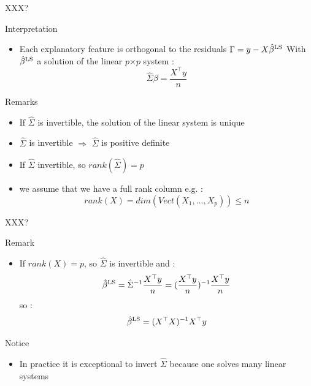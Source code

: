 \documentclass[unknownkeysallowed]{beamer}
\begin{document}
\begin{frame}{XXX?} %
\begin{alertblock}{Interpretation}
    \begin{itemize}
        \item  Each explanatory feature is orthogonal to the residuals $\Gamma=y-X\hat{\beta}^{\rm LS}$ With $\hat{\beta}^{\rm LS}$ a solution of the linear $p$$\times$$p$ system : $$ \hat{\Sigma}\beta= \frac{X^{\top} y}{n}  $$

    \end{itemize}
\end{alertblock}


\begin{block}{Remarks}
    \begin{itemize}
        \item  If $\hat{\Sigma}$ is invertible, the solution of the linear system is unique
        \item $\hat{\Sigma}$ is invertible $\Rightarrow$ $\hat{\Sigma}$ is positive definite
        \item If $\hat{\Sigma}$ invertible, so $rank(\hat{\Sigma})=p$
        \item we assume that we have a full rank column e.g. : $$rank(X)=dim(Vect(X_1,\dots,X_p)) \leq n $$

    \end{itemize}
\end{block}
\end{frame}


\begin{frame}{XXX?} %

\begin{alertblock}{Remark}
    \begin{itemize}
        \item  If $rank(X)=p$, so $\hat{\Sigma}$ is invertible and : $$\hat{\beta}^{\rm LS}=\hat{\Sigma}^{-1}\frac{X^{\top} y}{n}=(\frac{X^{\top} y}{n})^{-1} \frac{X^{\top} y}{n}$$
       so :  $$ \hat{\beta}^{\rm LS}=(X^{\top}X)^{-1}X^{\top}y$$

    \end{itemize}


\end{alertblock}

\begin{block}{Notice}
    \begin{itemize}
        \item  In practice it is exceptional to invert $\hat{\Sigma} $ because one solves many linear systems

    \end{itemize}


\end{block}
\end{frame}
\end{document}
